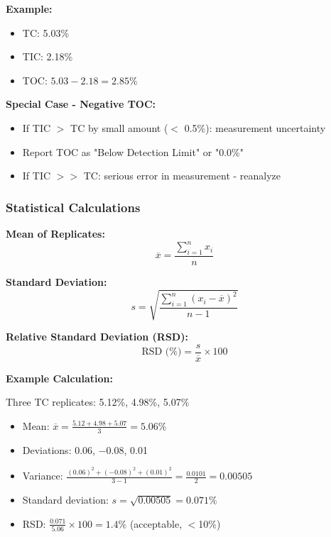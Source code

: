\documentclass[11pt,a4paper]{article}\usepackage[]{graphicx}\usepackage[]{xcolor}
\begin{document}
\textbf{Example:}
\begin{itemize}[noitemsep]
    \item TC: 5.03\%
    \item TIC: 2.18\%
    \item TOC: $5.03 - 2.18 = 2.85\%$
\end{itemize}

\textbf{Special Case - Negative TOC:}
\begin{itemize}[noitemsep]
    \item If TIC $>$ TC by small amount ($<$ 0.5\%): measurement uncertainty
    \item Report TOC as "Below Detection Limit" or "0.0\%"
    \item If TIC $>>$ TC: serious error in measurement - reanalyze
\end{itemize}

\subsubsection{Statistical Calculations}

\textbf{Mean of Replicates:}
\begin{equation}
\overline{x} = \frac{\sum_{i=1}^{n} x_i}{n}
\end{equation}

\textbf{Standard Deviation:}
\begin{equation}
s = \sqrt{\frac{\sum_{i=1}^{n}(x_i - \overline{x})^2}{n-1}}
\end{equation}

\textbf{Relative Standard Deviation (RSD):}
\begin{equation}
\text{RSD (\%)} = \frac{s}{\overline{x}} \times 100
\end{equation}

\textbf{Example Calculation:}

Three TC replicates: 5.12\%, 4.98\%, 5.07\%

\begin{itemize}[noitemsep]
    \item Mean: $\overline{x} = \frac{5.12 + 4.98 + 5.07}{3} = 5.06\%$
    \item Deviations: 0.06, $-$0.08, 0.01
    \item Variance: $\frac{(0.06)^2 + (-0.08)^2 + (0.01)^2}{3-1} = \frac{0.0101}{2} = 0.00505$
    \item Standard deviation: $s = \sqrt{0.00505} = 0.071\%$
    \item RSD: $\frac{0.071}{5.06} \times 100 = 1.4\%$ (acceptable, $<$10\%)
\end{itemize}
\end{document}
